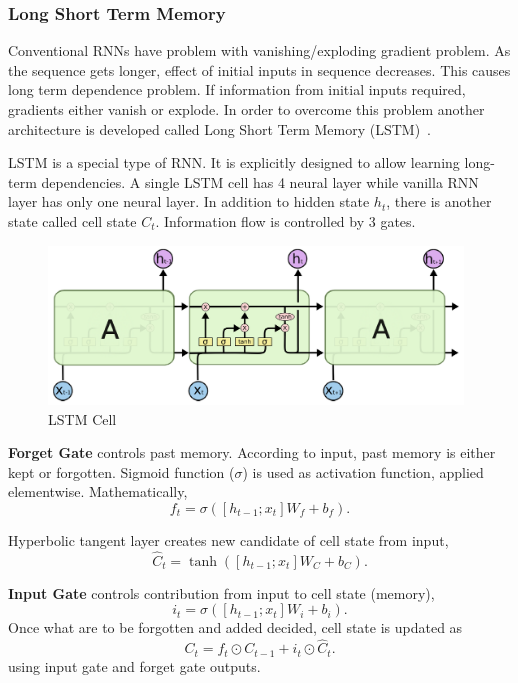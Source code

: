 \subsubsection{Long Short Term Memory}

Conventional RNNs have problem with vanishing/exploding gradient problem. 
As the sequence gets longer, effect of initial inputs in sequence decreases. 
This causes long term dependence problem. 
If information from initial inputs required, gradients either vanish or explode. 
In order to overcome this problem another architecture is developed called Long Short Term Memory (LSTM)~\cite{hochreiter_long_1997}. 

LSTM is a special type of RNN. 
It is explicitly designed to allow learning long-term dependencies. 
A single LSTM cell has 4 neural layer while vanilla RNN layer has only one neural layer. 
In addition to hidden state $h_t$, there is another state called cell state $C_t$. 
Information flow is controlled by 3 gates. 

\begin{figure}
	\centering
	\includegraphics[width=0.98\textwidth]{figures/ml_theory/lstm/lstm_module.png}
	\caption{LSTM Cell}
	\label{fig:lstm_cell}
\end{figure}

\textbf{Forget Gate} controls past memory. 
According to input, past memory is either kept or forgotten. 
Sigmoid function ($\sigma$) is used as activation function, applied elementwise. Mathematically, 
\begin{equation}
\label{eqn:lstm_forget}
f_t = \sigma( [h_{t-1}; x_t] W_f + b_f).
\end{equation}

Hyperbolic tangent layer creates new candidate of cell state from input, 
\begin{equation}
\label{eqn:lstm_cellstcand}
\hat{C}_t = \tanh( [h_{t-1}; x_t] W_C + b_C).
\end{equation}

\textbf{Input Gate} controls contribution from input to cell state (memory), 
\begin{equation}
\label{eqn:lstm_inp}
i_t = \sigma( [h_{t-1}; x_t] W_i + b_{i}).
\end{equation}
Once what are to be forgotten and added decided, cell state is updated as
\begin{equation}
\label{eqn:lstm_cellstupt}
C_t = f_t \odot C_{t-1} + i_t \odot \hat{C}_t.
\end{equation}
using input gate and forget gate outputs.

